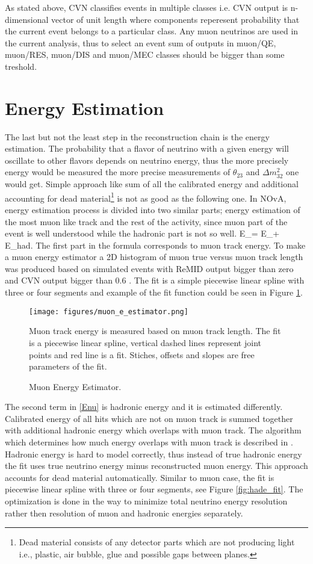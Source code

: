 As stated above, CVN classifies events in multiple classes i.e. CVN output is n-dimensional vector of unit length
where components reperesent probability that the current event belongs to a particular class. Any muon neutrinos
are used in the current analysis, thus to select an event sum of outputs in muon/QE, muon/RES, muon/DIS and 
muon/MEC classes should be bigger than some treshold.

\section{Energy Estimation}
The last but not the least step in the reconstruction chain is the energy estimation. The probability that a 
flavor of neutrino with a given energy will oscillate to other flavors depends on neutrino energy, thus the more 
precisely energy would be measured the more precise measurements of $\theta_{23}$ and $\Delta m_{32}^2$ one 
would get. Simple approach like sum of all the calibrated  energy and additional accounting for dead 
material\footnote{Dead material consists of any detector parts which are not producing light i.e., plastic, air 
bubble, glue and possible gaps between planes.} is not as good as the following one. In NOvA, energy estimation 
process is divided into two similar parts; energy estimation of the most muon like track and the rest of the 
activity, since muon part of the event is well understood while the hadronic part is not so well.
\be
E_\nu = E_\mu + E_{had}.
\ee 
The first part in the formula corresponds to muon track energy. To make a muon energy estimator a 2D histogram of 
muon true versus muon track length was produced based on simulated events with ReMID output bigger than zero and
CVN output bigger than 0.6 \cite{energy_technote}. The fit is a simple piecewise linear spline with three or 
four segments and example of the fit function could be seen in Figure \ref{fig:mue_fit}.
\begin{figure}[t]
\texttt{[image: figures/muon\_e\_estimator.png]}
\centering
\caption{Muon Energy Estimator.}
{Muon track energy is measured based on muon track length. The fit is a piecewise linear spline, vertical dashed
lines represent joint points and red line is a fit. Stiches, offsets and slopes are free parameters of the fit.}
\label{fig:mue_fit}
\end{figure}

The second term in \ref{Enu} is hadronic energy and it is estimated differently. Calibrated energy of all hits 
which are not on muon track is summed together with additional hadronic energy which overlaps with muon track. 
The algorithm which determines how much energy overlaps with muon track is described in \cite{Kanika}. Hadronic
energy is hard to model correctly, thus instead of true hadronic energy the fit uses true neutrino energy minus
reconstructed muon energy. This approach accounts for dead material automatically. Similar to muon case, the fit 
is piecewise linear spline with three or four segments, see Figure \ref{fig:hade_fit}. The optimization is done
in the way to minimize total neutrino energy resolution rather then resolution of muon and hadronic energies 
separately. 

